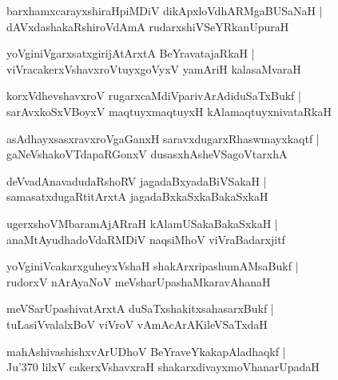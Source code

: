 \documentclass[twoside,12pt,openright]{book}
\newcounter{shloka}[chapter]
\begin{document}
\begin{shloka}%
barxhamxcarayxshiraHpiMDiV dikApxloVdhARMgaBUSaNaH |\\
dAVxdashakaRshiroVdAmA rudarxshiVSeYRkanUpuraH
\end{shloka}

\begin{shloka}%
yoVginiVgarxsatxgirijAtArxtA BeYravatajaRkaH |\\
viVracakerxVshavxroVtuyxgoVyxV yamAriH kalasaMvaraH
\end{shloka}

\begin{shloka}%
korxVdhevshavxroV rugarxcaMdiVparivArAdiduSaTxBukf |\\
sarAvxkoSxVBoyxV maqtuyxmaqtuyxH kAlamaqtuyxnivataRkaH 
\end{shloka}

\begin{shloka}%
asAdhayxsasxravxroVgaGanxH saravxdugarxRhaswmayxkaqtf |\\
gaNeVshakoVTdapaRGonxV dusasxhAsheVSagoVtarxhA 
\end{shloka}

\begin{shloka}%
deVvadAnavadudaRshoRV jagadaBxyadaBiVSakaH |\\
samasatxdugaRtitArxtA jagadaBxkaSxkaBakaSxkaH 
\end{shloka}

\begin{shloka}%
ugerxshoVMbaramAjARraH kAlamUSakaBakaSxkaH |\\
anaMtAyudhadoVdaRMDiV naqsiMhoV viVraBadarxjitf
\end{shloka}

\begin{shloka}%
yoVginiVcakarxguheyxVshaH shakArxripashumAMsaBukf |\\
rudorxV nArAyaNoV meVsharUpashaMkaravAhanaH 
\end{shloka}

\begin{shloka}%
meVSarUpashivatArxtA duSaTxshakitxsahasarxBukf |\\
tuLasiVvalalxBoV viVroV vAmAcArAKileVSaTxdaH 
\end{shloka}

\begin{shloka}%
mahAshivashishxvArUDhoV  BeYraveYkakapAladhaqkf |\\
Ju\char'370 lilxV cakerxVshavxraH shakarxdivayxmoVhanarUpadaH
\end{shloka}
\end{document}
